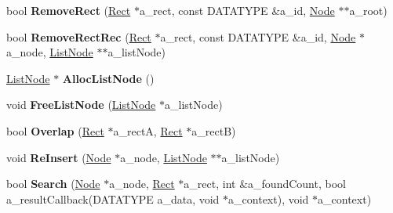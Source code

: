 \begin{DoxyCompactItemize}
\item 
\hypertarget{class_r_tree_a64a1092e85775014ce01e1bb6bc8a938}{bool {\bfseries \-Remove\-Rect} (\hyperlink{struct_r_tree_1_1_rect}{\-Rect} $\ast$a\-\_\-rect, const \-D\-A\-T\-A\-T\-Y\-P\-E \&a\-\_\-id, \hyperlink{struct_r_tree_1_1_node}{\-Node} $\ast$$\ast$a\-\_\-root)}\label{class_r_tree_a64a1092e85775014ce01e1bb6bc8a938}

\item 
\hypertarget{class_r_tree_a519d3084a57b45ed4e4167b382bc977e}{bool {\bfseries \-Remove\-Rect\-Rec} (\hyperlink{struct_r_tree_1_1_rect}{\-Rect} $\ast$a\-\_\-rect, const \-D\-A\-T\-A\-T\-Y\-P\-E \&a\-\_\-id, \hyperlink{struct_r_tree_1_1_node}{\-Node} $\ast$a\-\_\-node, \hyperlink{struct_r_tree_1_1_list_node}{\-List\-Node} $\ast$$\ast$a\-\_\-list\-Node)}\label{class_r_tree_a519d3084a57b45ed4e4167b382bc977e}

\item 
\hypertarget{class_r_tree_aa688a31e4de0090985045cfabfa42d2d}{\hyperlink{struct_r_tree_1_1_list_node}{\-List\-Node} $\ast$ {\bfseries \-Alloc\-List\-Node} ()}\label{class_r_tree_aa688a31e4de0090985045cfabfa42d2d}

\item 
\hypertarget{class_r_tree_a0c92660832f03d899608d73b994e95a5}{void {\bfseries \-Free\-List\-Node} (\hyperlink{struct_r_tree_1_1_list_node}{\-List\-Node} $\ast$a\-\_\-list\-Node)}\label{class_r_tree_a0c92660832f03d899608d73b994e95a5}

\item 
\hypertarget{class_r_tree_aa5b369536a94aa8ad9ec3b4f8f68302c}{bool {\bfseries \-Overlap} (\hyperlink{struct_r_tree_1_1_rect}{\-Rect} $\ast$a\-\_\-rect\-A, \hyperlink{struct_r_tree_1_1_rect}{\-Rect} $\ast$a\-\_\-rect\-B)}\label{class_r_tree_aa5b369536a94aa8ad9ec3b4f8f68302c}

\item 
\hypertarget{class_r_tree_a5d2b072588eae9e9058224942ae0294f}{void {\bfseries \-Re\-Insert} (\hyperlink{struct_r_tree_1_1_node}{\-Node} $\ast$a\-\_\-node, \hyperlink{struct_r_tree_1_1_list_node}{\-List\-Node} $\ast$$\ast$a\-\_\-list\-Node)}\label{class_r_tree_a5d2b072588eae9e9058224942ae0294f}

\item 
\hypertarget{class_r_tree_af2baaed34f4e0cf20597074ebfb77ac4}{bool {\bfseries \-Search} (\hyperlink{struct_r_tree_1_1_node}{\-Node} $\ast$a\-\_\-node, \hyperlink{struct_r_tree_1_1_rect}{\-Rect} $\ast$a\-\_\-rect, int \&a\-\_\-found\-Count, bool a\-\_\-result\-Callback(\-D\-A\-T\-A\-T\-Y\-P\-E a\-\_\-data, void $\ast$a\-\_\-context), void $\ast$a\-\_\-context)}\label{class_r_tree_af2baaed34f4e0cf20597074ebfb77ac4}


\end{DoxyCompactItemize}
